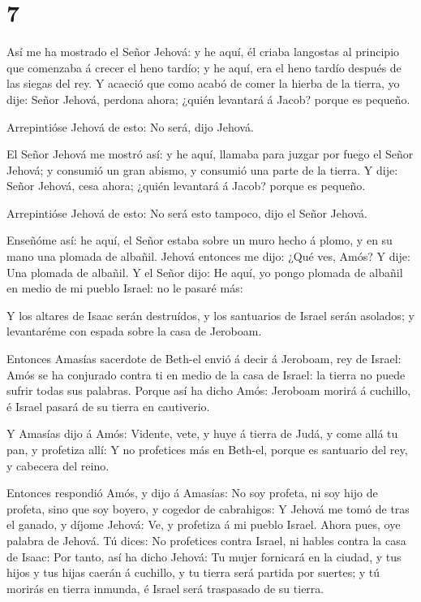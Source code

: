 \hypertarget{section-6}{%
\section{7}\label{section-6}}

 Así me ha mostrado el Señor Jehová: y he aquí, él criaba
langostas al principio que comenzaba á crecer el heno tardío; y he aquí,
era el heno tardío después de las siegas del rey.  Y acaeció
que como acabó de comer la hierba de la tierra, yo dije: Señor Jehová,
perdona ahora; ¿quién levantará á Jacob? porque es pequeño.

 Arrepintióse Jehová de esto: No será, dijo Jehová.

 El Señor Jehová me mostró así: y he aquí, llamaba para
juzgar por fuego el Señor Jehová; y consumió un gran abismo, y consumió
una parte de la tierra.  Y dije: Señor Jehová, cesa ahora;
¿quién levantará á Jacob? porque es pequeño.

 Arrepintióse Jehová de esto: No será esto tampoco, dijo el
Señor Jehová.

 Enseñóme así: he aquí, el Señor estaba sobre un muro hecho
á plomo, y en su mano una plomada de albañil.  Jehová
entonces me dijo: ¿Qué ves, Amós? Y dije: Una plomada de albañil. Y el
Señor dijo: He aquí, yo pongo plomada de albañil en medio de mi pueblo
Israel: no le pasaré más:

 Y los altares de Isaac serán destruídos, y los santuarios
de Israel serán asolados; y levantaréme con espada sobre la casa de
Jeroboam.

 Entonces Amasías sacerdote de Beth-el envió á decir á
Jeroboam, rey de Israel: Amós se ha conjurado contra ti en medio de la
casa de Israel: la tierra no puede sufrir todas sus palabras.
 Porque así ha dicho Amós: Jeroboam morirá á cuchillo, é
Israel pasará de su tierra en cautiverio.

 Y Amasías dijo á Amós: Vidente, vete, y huye á tierra de
Judá, y come allá tu pan, y profetiza allí:  Y no
profetices más en Beth-el, porque es santuario del rey, y cabecera del
reino.

 Entonces respondió Amós, y dijo á Amasías: No soy profeta,
ni soy hijo de profeta, sino que soy boyero, y cogedor de cabrahigos:
 Y Jehová me tomó de tras el ganado, y díjome Jehová: Ve, y
profetiza á mi pueblo Israel.  Ahora pues, oye palabra de
Jehová. Tú dices: No profetices contra Israel, ni hables contra la casa
de Isaac:  Por tanto, así ha dicho Jehová: Tu mujer
fornicará en la ciudad, y tus hijos y tus hijas caerán á cuchillo, y tu
tierra será partida por suertes; y tú morirás en tierra inmunda, é
Israel será traspasado de su tierra.

